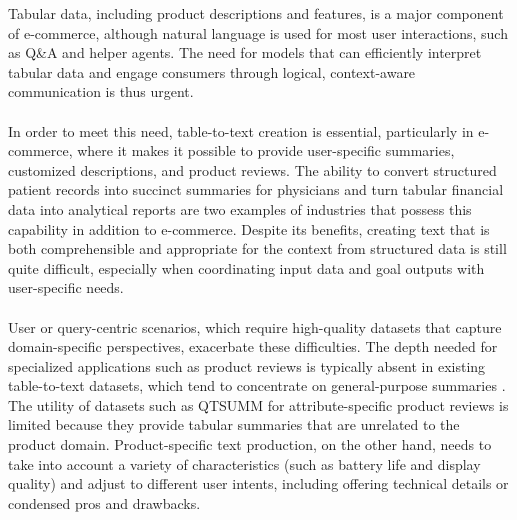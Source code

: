 Tabular data, including product descriptions and features, is a major component of e-commerce, although natural language is used for most user interactions, such as Q\&A and helper agents. The need for models that can efficiently interpret tabular data and engage consumers through logical, context-aware communication is thus urgent.
\\\\
In order to meet this need, table-to-text creation is essential, particularly in e-commerce, where it makes it possible to provide user-specific summaries, customized descriptions, and product reviews. The ability to convert structured patient records into succinct summaries for physicians \cite{he2023survey} and turn tabular financial data into analytical reports \cite{Varshney_2024} are two examples of industries that possess this capability in addition to e-commerce. Despite its benefits, creating text that is both comprehensible and appropriate for the context from structured data is still quite difficult, especially when coordinating input data and goal outputs with user-specific needs.
\\\\
User or query-centric scenarios, which require high-quality datasets that capture domain-specific perspectives, exacerbate these difficulties. The depth needed for specialized applications such as product reviews is typically absent in existing table-to-text datasets, which tend to concentrate on general-purpose summaries \cite{macková2023promapdatasetsproductmapping}. The utility of datasets such as QTSUMM \cite{zhao2023qtsummqueryfocusedsummarizationtabular} for attribute-specific product reviews is limited because they provide tabular summaries that are unrelated to the product domain. Product-specific text production, on the other hand, needs to take into account a variety of characteristics (such as battery life and display quality) and adjust to different user intents, including offering technical details or condensed pros and drawbacks.
 
